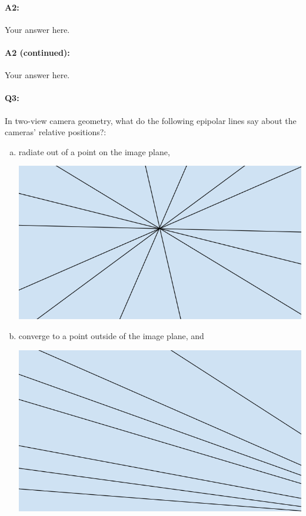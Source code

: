 \paragraph{A2:} Your answer here.









\pagebreak
\paragraph{A2 (continued):} Your answer here.



\pagebreak
\paragraph{Q3:} In two-view camera geometry, what do the following epipolar lines say about the cameras' relative positions?:
\begin{enumerate}[(a)]
\item radiate out of a point on the image plane,

\includegraphics[width = 0.25\linewidth]{q3-a.PNG}
\item converge to a point outside of the image plane, and

\includegraphics[width = 0.25\linewidth]{q3-b.PNG}
\end{enumerate}

